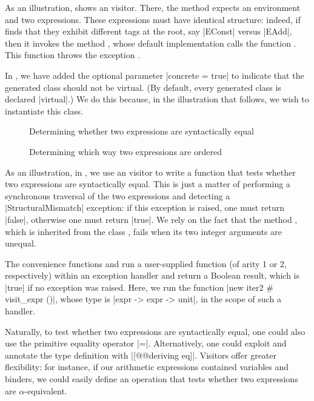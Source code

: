 \documentclass[11pt,a4paper,twoside]{article}
\begin{document}
As an illustration,  shows an \itertwo visitor. There, the
method  expects an environment and two expressions. These
expressions must have identical structure: indeed, if 
finds that they exhibit different tags at the root, say \oc|EConst| versus
\oc|EAdd|, then it invokes the method , whose default
implementation calls the function . This function
throws the exception .

In , we have added the optional parameter
%
\oc|concrete = true|
%
to indicate that the generated class should not be virtual. (By default,
every generated class is declared \oc|virtual|.) We do this because, in
the illustration that follows, we wish to instantiate this class.

\begin{figure}[p]
\caption{Determining whether two expressions are syntactically equal}
\label{fig:expr05}
\end{figure}

\begin{figure}[p]
\caption{Determining which way two expressions are ordered}
\label{fig:expr05lexico}
\end{figure}

As an illustration, in , we use an \itertwo visitor to write
a function that tests whether two expressions are syntactically equal. This is
just a matter of performing a synchronous traversal of the two expressions and
detecting a \oc|StructuralMismatch| exception: if this exception is raised,
one must return \oc|false|, otherwise one must return \oc|true|. We rely on
the fact that the method , which is inherited from the class
, fails when its two integer arguments are
unequal.

The convenience functions  and
 run a user-supplied function (of arity 1 or 2,
respectively) within an exception handler and return a Boolean result, which
is \oc|true| if no exception was raised. Here, we run the function
%
\oc|new iter2 # visit_expr ()|, whose type is \oc|expr -> expr -> unit|,
in the scope of such a handler.

Naturally, to test whether two expressions are syntactically equal, one could
also use the primitive equality operator \oc|=|. Alternatively, one could
exploit \ppxderiving and annotate the type definition with
%
\oc|[@@deriving eq]|. Visitors offer greater flexibility: for instance, if our
arithmetic expressions contained variables and binders, we could easily define
an operation that tests whether two expressions are $\alpha$-equivalent.
\end{document}

